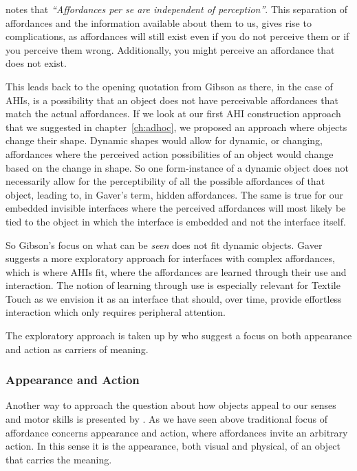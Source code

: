 \citet{gaver1991technology} notes that \emph{``Affordances per se are independent of perception''}.
This separation of affordances and the information available about them to us, gives rise to complications, as affordances will still exist even if you do not perceive them or if you perceive them wrong.
Additionally, you might perceive an affordance that does not exist.

This leads back to the opening quotation from Gibson as there, in the case of AHIs, is a possibility that an object does not have perceivable affordances that match the actual affordances.
If we look at our first AHI construction approach that we suggested in chapter~\ref{ch:adhoc}, we proposed an approach where objects change their shape.
Dynamic shapes would allow for dynamic, or changing, affordances where the perceived action possibilities of an object would change based on the change in shape.
So one form-instance of a dynamic object does not necessarily allow for the perceptibility of all the possible affordances of that object, leading to, in Gaver's term, hidden affordances. 
The same is true for our embedded invisible interfaces where the perceived affordances will most likely be tied to the object in which the interface is embedded and not the interface itself.

So Gibson's focus on what can be \emph{seen} does not fit dynamic objects.
Gaver suggests a more exploratory approach for interfaces with complex affordances, which is where AHIs fit, where the affordances are learned through their use and interaction.
The notion of learning through use is especially relevant for Textile Touch as we envision it as an interface that should, over time, provide effortless interaction which only requires peripheral attention.

The exploratory approach is taken up by \citet{djajadiningrat2004tangible} who suggest a focus on both appearance and action as carriers of meaning.

\subsubsection{Appearance and Action}
Another way to approach the question about how objects appeal to our senses and motor skills is presented by \citet{djajadiningrat2004tangible}.
As we have seen above traditional focus of affordance concerns appearance and action, where affordances invite an arbitrary action. 
In this sense it is the appearance, both visual and physical, of an object that carries the meaning.

